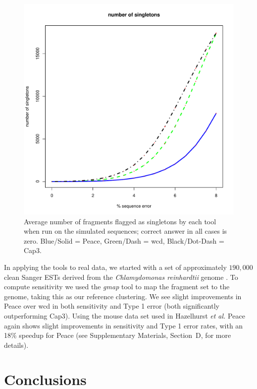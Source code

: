 \documentclass[a4,center,fleqn]{NAR}
\begin{document}
\begin{figure}[b]
\begin{minipage}{2in}
\centerline{
\includegraphics[scale=0.35]{pics.d/singletons.pdf}
}
\end{minipage}
\label{singletons}
\caption{Average number of fragments flagged as singletons by each tool
  when run on the simulated sequences; correct answer in all cases is
  zero.  Blue/Solid = {\sc Peace}, Green/Dash = {\sc wcd},
  Black/Dot-Dash = {\sc Cap3}.}
\end{figure}

In applying the tools to real data, we started with a set of
approximately $190,000$ clean Sanger ESTs derived from the {\it
  Chlamydomonas reinhardtii} genome \cite{Liang2008}.  To compute
sensitivity we used the {\it gmap} tool \cite{Wu05} to map the
fragment set to the genome, taking this as our reference clustering.
We see slight improvements in {\sc Peace} over {\sc wcd} in both
sensitivity and Type 1 error (both significantly outperforming {\sc
  Cap3}).  Using the mouse data set used in Hazelhurst {\it et al.}
\cite{Hazelhurst08a} {\sc Peace} again shows slight improvements in
sensitivity and Type 1 error rates, with an 18\% speedup for {\sc
  Peace} (see Supplementary Materials, Section~D, for more details).

\section{Conclusions}
\end{document}
